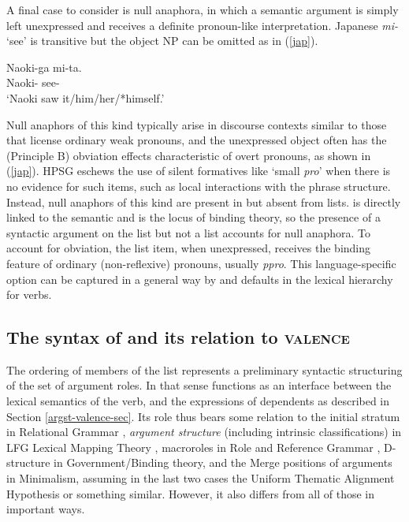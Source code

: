 \documentclass[output=paper
                ,modfonts
                ,nonflat
	        ,collection
	        ,collectionchapter
	        ,collectiontoclongg
 	        ,biblatex
                ,babelshorthands
                ,newtxmath
                ,draftmode
                ,colorlinks, citecolor=brown
]{./langsci/langscibook}
\begin{document}
A final case to consider is null anaphora, in which a semantic argument is simply left unexpressed and receives a definite pronoun-like interpretation.  Japanese \textit{mi-} `see' is transitive but the object NP can be omitted as in (\ref{jap}).

\begin{exe}
	\ex\label{jap}
		\gll Naoki-ga mi-ta.  \\
		Naoki- see-  \\
		\glt `Naoki saw it/him/her/*himself.'
\end{exe} 

\noindent
Null anaphors of this kind typically arise in discourse contexts similar to those that license ordinary weak pronouns, and the unexpressed object often has the (Principle B) obviation effects characteristic of overt pronouns,  as shown in (\ref{jap}).  HPSG eschews the use of silent formatives like `small \textit{pro}' when there is no evidence for such items, such as local interactions with the phrase structure.  Instead, null anaphors of this kind are present in \argst but absent from \val lists.  \argst is directly linked to the semantic \content and is the locus of binding theory, so the presence of a syntactic argument on the \argst list but not a \val list
 accounts for null anaphora.  To account for obviation, the \argst list item, when unexpressed, receives the binding feature of ordinary (non-reflexive) pronouns, usually \textit{ppro}.  This language-specific option can be captured in a general way by \val and \argst defaults in the lexical hierarchy for verbs.   

\subsection{The syntax of \argst and its relation to \textsc{valence}}
\label{argst-sec}


The ordering of members of the \argst list represents a preliminary syntactic structuring of the set of argument roles.  In that sense \argst functions as an interface between the lexical semantics of the verb, and the expressions of dependents as described in Section \ref{argst-valence-sec}.  Its role thus bears some relation to the initial stratum in Relational Grammar \citep{PerlmutterandPostal1984},  \textit{argument structure} (including intrinsic classifications) in LFG Lexical Mapping Theory  \citep{Bresnan+etal:2015}, macroroles in Role and Reference Grammar \citep{VanValinandLapolla1997}, D-structure in Government/Binding theory, and the Merge positions of arguments in Minimalism,  assuming in the last two cases the Uniform Thematic Alignment Hypothesis \citep{Baker1988} or something similar.  However, it also differs from all of those in important ways.  
\end{document}
